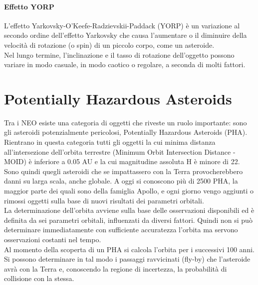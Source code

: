 \documentclass[a4paper,11pt,openright]{book}
\begin{document}
\paragraph*{Effetto YORP}
L’effetto Yarkovsky-O'Keefe-Radzievskii-Paddack (YORP) è un variazione al secondo ordine dell’effetto Yarkovsky che causa l’aumentare o il diminuire della velocità di rotazione (o spin) di un piccolo corpo, come un asteroide.\\
Nel lungo termine, l'inclinazione e il tasso di rotazione dell'oggetto possono variare in modo casuale, in modo caotico o regolare, a seconda di molti fattori.

\section{Potentially Hazardous Asteroids}\label{sec:pha}
Tra i NEO esiste una categoria di oggetti che riveste un ruolo importante: sono gli asteroidi potenzialmente pericolosi, Potentially Hazardous Asteroids (PHA). Rientrano in questa categoria tutti gli oggetti la cui minima distanza all'intersezione dell'orbita terrestre (Minimum Orbit Intersection Distance - MOID) è inferiore a 0.05 AU e la cui magnitudine assoluta H è minore di 22. Sono quindi quegli asteroidi che se impattassero con la Terra provocherebbero danni su larga scala, anche globale. A oggi si conoscono più di 2500 PHA, la maggior parte dei quali sono della famiglia Apollo, e ogni giorno vengo aggiunti o rimossi oggetti sulla base di nuovi risultati dei parametri orbitali.\\
La determinazione dell'orbita avviene sulla base delle osservazioni disponibili ed è definita da sei parametri orbitali, influenzati da diversi fattori. Quindi non si può determinare immediatamente con sufficiente accuratezza l'orbita ma servono osservazioni costanti nel tempo.\\
Al momento della scoperta di un PHA si calcola l'orbita per i successivi 100 anni. Si possono determinare in tal modo i passaggi ravvicinati (fly-by) che l'asteroide avrà con la Terra e, conoscendo la regione di incertezza, la probabilità di collisione con la stessa.
\end{document}
